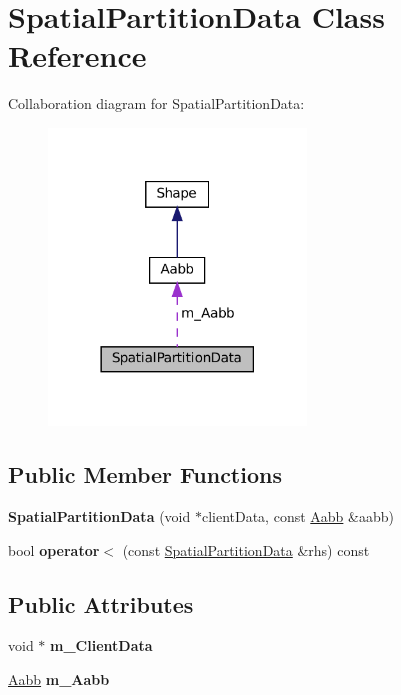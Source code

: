 \hypertarget{classSpatialPartitionData}{}\section{Spatial\+Partition\+Data Class Reference}
\label{classSpatialPartitionData}


Collaboration diagram for Spatial\+Partition\+Data\+:\nopagebreak
\begin{figure}[H]
\begin{center}
\leavevmode
\includegraphics[width=194pt]{classSpatialPartitionData__coll__graph}
\end{center}
\end{figure}
\subsection*{Public Member Functions}
\begin{DoxyCompactItemize}
\item 
\mbox{\label{classSpatialPartitionData_ae68774df30d93ce8d2b5d51fb4d78bbc}} 
{\bfseries Spatial\+Partition\+Data} (void $\ast$client\+Data, const \hyperlink{classAabb}{Aabb} \&aabb)
\item 
\mbox{\label{classSpatialPartitionData_adcebf770064b351b8db5e5d792059a0e}} 
bool {\bfseries operator$<$} (const \hyperlink{classSpatialPartitionData}{Spatial\+Partition\+Data} \&rhs) const
\end{DoxyCompactItemize}
\subsection*{Public Attributes}
\begin{DoxyCompactItemize}
\item 
\mbox{\label{classSpatialPartitionData_a384e22a7c27282607481fe65f337de3c}} 
void $\ast$ {\bfseries m\+\_\+\+Client\+Data}
\item 
\mbox{\label{classSpatialPartitionData_a4961e1a375165bf9ef6b771277ad79d2}} 
\hyperlink{classAabb}{Aabb} {\bfseries m\+\_\+\+Aabb}
\end{DoxyCompactItemize}


